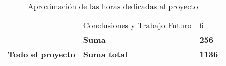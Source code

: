 \begin{table}[]
\begin{tabular}{|c|l|l|}
                                        & Conclusiones y Trabajo Futuro                   & 6                                             \\ \cline{2-3} 
                                        & \textbf{Suma}                                   & \textbf{256}                                  \\ \hline
\textbf{Todo el proyecto}               & \textbf{Suma total}                             & \textbf{1136}                                 \\ \hline
\end{tabular}

\caption{Aproximación de las horas dedicadas al proyecto}
\label{horas}
\end{table}
